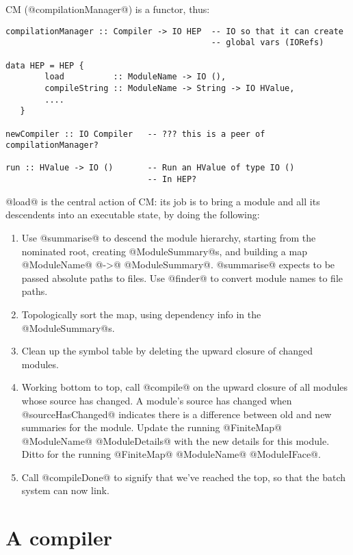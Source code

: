 \documentclass[11pt]{article}
\begin{document}
CM (@compilationManager@) is a functor, thus:
\begin{verbatim}
compilationManager :: Compiler -> IO HEP  -- IO so that it can create 
                                          -- global vars (IORefs)

data HEP = HEP {
        load          :: ModuleName -> IO (),
        compileString :: ModuleName -> String -> IO HValue,
        ....
   }

newCompiler :: IO Compiler   -- ??? this is a peer of compilationManager?

run :: HValue -> IO ()       -- Run an HValue of type IO ()
                             -- In HEP?
\end{verbatim}

@load@ is the central action of CM: its job is to bring a module and
all its descendents into an executable state, by doing the following:
\begin{enumerate}
\item 
   Use @summarise@ to descend the module hierarchy, starting from the
   nominated root, creating @ModuleSummary@s, and
   building a map @ModuleName@ @->@ @ModuleSummary@.  @summarise@ 
   expects to be passed absolute paths to files.  Use @finder@ to 
   convert module names to file paths.
\item
   Topologically sort the map, 
   using dependency info in the @ModuleSummary@s.
\item
   Clean up the symbol table by deleting the upward closure of 
   changed modules.
\item 
   Working bottom to top, call @compile@ on the upward closure of 
   all modules whose source has changed.  A module's source has
   changed when @sourceHasChanged@ indicates there is a difference
   between old and new summaries for the module.  Update the running
   @FiniteMap@ @ModuleName@ @ModuleDetails@ with the new details
   for this module.  Ditto for the running
   @FiniteMap@ @ModuleName@ @ModuleIFace@.
\item
   Call @compileDone@ to signify that we've reached the top, so
   that the batch system can now link.
\end{enumerate}


\section{A compiler}
\end{document}
